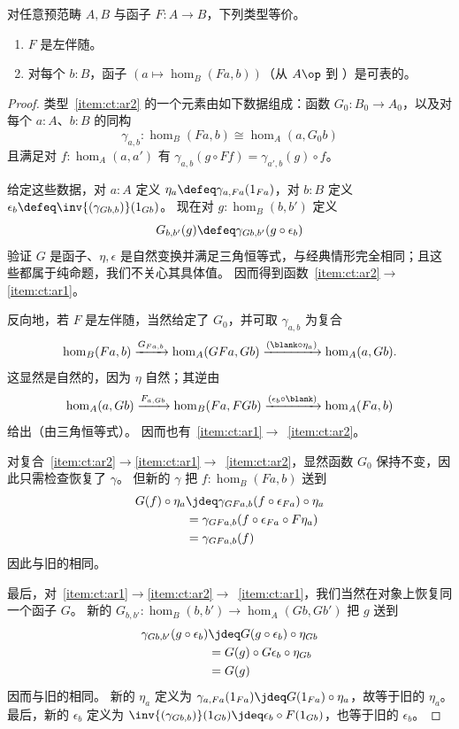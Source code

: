 \begin{lem}\label{ct:adj-repr}
  对任意预范畴 $A,B$ 与函子 $F:A\to B$，下列类型等价。
  \begin{enumerate}
  \item $F$ 是左伴随。\label{item:ct:ar1}
  \item 对每个 $b:B$，函子 $(a \mapsto \hom_B(Fa,b))$（从 $A\op$ 到 \uset）是可表的。\label{item:ct:ar2}
  \end{enumerate}
\end{lem}
\begin{proof}
  类型~\ref{item:ct:ar2} 的一个元素由如下数据组成：函数 $G_0:B_0 \to A_0$，以及对每个 $a:A$、$b:B$ 的同构
  \[ \gamma_{a,b}:\hom_B(Fa,b) \cong \hom_A(a,G_0 b) \]
  且满足对 $f:\hom_{A}(a,a')$ 有 $\gamma_{a,b}(g \circ Ff) = \gamma_{a',b}(g)\circ f$。

  给定这些数据，对 $a:A$ 定义 $\eta_a \defeq \gamma_{a,Fa}(1_{Fa})$，对 $b:B$ 定义 $\epsilon_b \defeq \inv{(\gamma_{Gb,b})}(1_{Gb})$。
  现在对 $g:\hom_B(b,b')$ 定义
  \[ G_{b,b'}(g) \defeq \gamma_{G b, b'}(g \circ \epsilon_b) \]
  验证 $G$ 是函子、$\eta,\epsilon$ 是自然变换并满足三角恒等式，与经典情形完全相同；且这些都属于纯命题，我们不关心其具体值。
  因而得到函数~\ref{item:ct:ar2}$\to$\ref{item:ct:ar1}。

  反向地，若 $F$ 是左伴随，当然给定了 $G_0$，并可取 $\gamma_{a,b}$ 为复合
  \[ \hom_B(Fa,b)
  \xrightarrow{G_{Fa,b}} \hom_A(GFa,Gb)
  \xrightarrow{(\blank\circ \eta_a)} \hom_A(a,Gb).
  \]
  这显然是自然的，因为 $\eta$ 自然；其逆由
  \[ \hom_A(a,Gb)
  \xrightarrow{F_{a,Gb}} \hom_B(Fa,FGb)
  \xrightarrow{(\epsilon_b \circ \blank )} \hom_A(Fa,b)
  \]
  给出（由三角恒等式）。
  因而也有~\ref{item:ct:ar1}$\to$~\ref{item:ct:ar2}。

  对复合~\ref{item:ct:ar2}$\to$\ref{item:ct:ar1}$\to$~\ref{item:ct:ar2}，显然函数 $G_0$ 保持不变，因此只需检查恢复了 $\gamma$。
  但新的 $\gamma$ 把 $f:\hom_B(Fa,b)$ 送到
  \begin{align*}
    G(f) \circ \eta_a
    &\jdeq \gamma_{G Fa, b}(f \circ \epsilon_{Fa}) \circ \eta_a\\
    &= \gamma_{G Fa, b}(f \circ \epsilon_{Fa} \circ F\eta_a)\\
    &= \gamma_{G Fa, b}(f)
  \end{align*}
  因此与旧的相同。

  最后，对~\ref{item:ct:ar1}$\to$\ref{item:ct:ar2}$\to$~\ref{item:ct:ar1}，我们当然在对象上恢复同一个函子 $G$。
  新的 $G_{b,b'}:\hom_B(b,b') \to \hom_A(Gb,Gb')$ 把 $g$ 送到
  \begin{align*}
    \gamma_{G b, b'}(g \circ \epsilon_b)
    &\jdeq G(g \circ \epsilon_b) \circ \eta_{Gb}\\
    &= G(g) \circ G\epsilon_b \circ \eta_{Gb}\\
    &= G(g)
  \end{align*}
  因而与旧的相同。
  新的 $\eta_a$ 定义为 $\gamma_{a,Fa}(1_{Fa}) \jdeq G(1_{Fa}) \circ \eta_a$，故等于旧的 $\eta_a$。
  最后，新的 $\epsilon_b$ 定义为 $\inv{(\gamma_{Gb,b})}(1_{Gb}) \jdeq \epsilon_b \circ F(1_{Gb})$，也等于旧的 $\epsilon_b$。
\end{proof}

